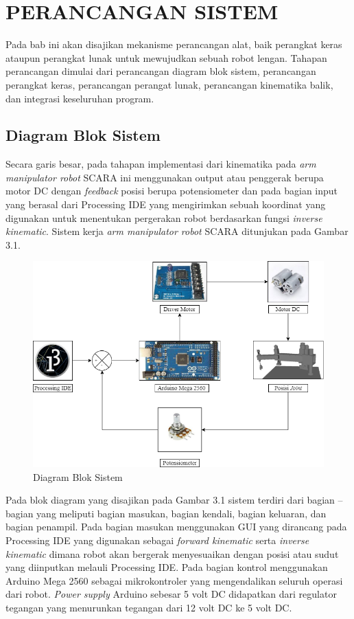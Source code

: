 
\chapter{PERANCANGAN SISTEM}
Pada bab ini akan disajikan mekanisme perancangan alat, baik perangkat keras ataupun perangkat lunak untuk mewujudkan sebuah robot lengan. Tahapan perancangan dimulai dari perancangan diagram blok sistem, perancangan perangkat keras, perancangan perangat lunak, perancangan kinematika balik, dan integrasi keseluruhan program. 
\section{ Diagram Blok Sistem }
Secara garis besar, pada tahapan implementasi dari kinematika pada \textit{arm manipulator robot} SCARA ini menggunakan output atau penggerak berupa motor DC dengan \textit{feedback} posisi berupa potensiometer dan pada bagian  input yang berasal dari Processing IDE yang mengirimkan sebuah koordinat yang digunakan untuk menentukan pergerakan robot berdasarkan fungsi \textit{inverse kinematic}. Sistem kerja \textit{arm manipulator robot} SCARA ditunjukan pada  Gambar 3.1.
\begin{figure}[H]
	\centering
	\includegraphics[width=12cm]{gambar/Rangkaian_Diagram.png}
	\caption{Diagram Blok Sistem}
\end{figure}
Pada blok diagram yang disajikan pada Gambar 3.1 sistem terdiri dari bagian – bagian yang meliputi bagian masukan, bagian kendali, bagian keluaran, dan bagian penampil. Pada bagian masukan menggunakan GUI yang dirancang pada Processing IDE yang digunakan sebagai \textit{forward kinematic} serta \textit{inverse kinematic} dimana robot akan bergerak menyesuaikan dengan posisi atau sudut yang diinputkan melauli Processing IDE. 
Pada bagian kontrol menggunakan Arduino Mega 2560 sebagai mikrokontroler yang mengendalikan seluruh operasi dari robot. \textit{Power supply} Arduino sebesar 5 volt DC didapatkan dari regulator tegangan yang menurunkan tegangan dari 12 volt DC ke 5 volt DC. 

